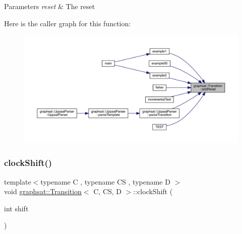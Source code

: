 \begin{DoxyParams}{Parameters}
{\em reset} & The reset \\
\hline
\end{DoxyParams}
Here is the caller graph for this function\+:
\nopagebreak
\begin{figure}[H]
\begin{center}
\leavevmode
\includegraphics[width=350pt]{classgraphsat_1_1_transition_ad406304a7c8d3ffad38c0f1578ef6e31_icgraph}
\end{center}
\end{figure}
\mbox{\label{classgraphsat_1_1_transition_ac489a29696f5620486df69e36ae3b2b3}} 
\subsubsection{\texorpdfstring{clockShift()}{clockShift()}}
{\footnotesize\ttfamily template$<$typename C , typename CS , typename D $>$ \\
void \mbox{\hyperlink{classgraphsat_1_1_transition}{graphsat\+::\+Transition}}$<$ C, CS, D $>$\+::clock\+Shift (\begin{DoxyParamCaption}\item[{int}]{shift }\end{DoxyParamCaption})\hspace{0.3cm}{\ttfamily [inline]}}

\mbox{\label{classgraphsat_1_1_transition_a22fa6286cb88f0aaf08c15ea8670ebe5}} 
